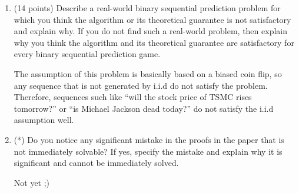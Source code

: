 \documentclass[a4paper, 12pt]{article}
\begin{document}
\begin{enumerate}
    \item (14 points) Describe a real-world binary sequential prediction problem for which you think the algorithm
    or its theoretical guarantee is not satisfactory and explain why. If you do not find such a real-world problem, then explain why you think the algorithm and its theoretical guarantee are satisfactory for every binary
    sequential prediction game.
    \par {\color{blue} The assumption of this problem is basically based on a biased coin flip, so any sequence that is not generated by i.i.d do not satisfy the problem. Therefore, sequences such like ``will the stock price of TSMC rises tomorrow?'' or ``is Michael Jackson dead today?'' do not satisfy the i.i.d assumption well.}
    \item (*) Do you notice any significant mistake in the proofs in the paper that is not immediately solvable? If yes,
    specify the mistake and explain why it is significant and cannot be immediately solved.
    \par {\color{blue} Not yet ;)}
\end{enumerate}

\printbibliography
\end{document}
